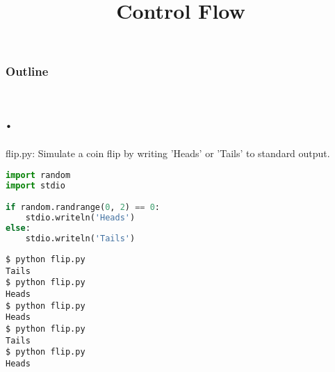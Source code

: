 \documentclass[8pt,a4paper,compress,handout]{beamer}
\title{Control Flow}
\date{}
\begin{document}
\begin{frame}
\vfill
\titlepage
\end{frame}

\begin{frame}
\frametitle{Outline}
\tableofcontents
\end{frame}

\section{.}
\begin{frame}[fragile]
\begin{framed}
\tiny flip.py: Simulate a coin flip by writing 'Heads' or 'Tails' to standard output.
\end{framed}

\begin{lstlisting}[language=Python]
import random
import stdio

if random.randrange(0, 2) == 0:
    stdio.writeln('Heads')
else:
    stdio.writeln('Tails')
\end{lstlisting}

\begin{lstlisting}[language={}]
$ python flip.py 
Tails
$ python flip.py 
Heads
$ python flip.py 
Heads
$ python flip.py 
Tails
$ python flip.py 
Heads
\end{lstlisting}
\end{frame}

\begin{frame}[fragile]
\begin{framed}
\tiny
\end{framed}

\begin{lstlisting}[language=Python]

\end{lstlisting}

\begin{lstlisting}[language={}]

\end{lstlisting}
\end{frame}
\end{document}
